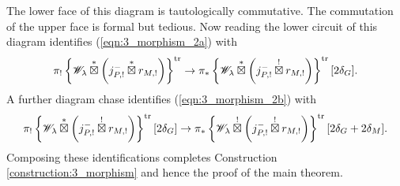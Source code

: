 The lower face of this diagram is tautologically commutative. The commutation of the upper face is formal but tedious. Now reading the lower circuit of this diagram identifies (\ref{eqn:3_morphism_2a}) with
    \[
    \pi_! \left\{ \mathscr{W}_\lambda \overset{*}{\boxtimes} \left( j_{P,!}^- \overset{*}{\boxtimes} r_{M,!} \right) \right\}^{\mathrm{tr}} 
    \to \pi_* \left\{ \mathscr{W}_\lambda \overset{*}{\boxtimes} \left( j_{P,!}^- \overset{!}{\boxtimes} r_{M,!} \right) \right\}^{\mathrm{tr}} [2 \delta_G].
    \]
A further diagram chase identifies (\ref{eqn:3_morphism_2b}) with
    \[
    \pi_! \left\{ \mathscr{W}_\lambda \overset{*}{\boxtimes} \left( j_{P,!}^- \overset{!}{\boxtimes} r_{M,!} \right) \right\}^{\mathrm{tr}} [2 \delta_G]
    \to \pi_* \left\{ \mathscr{W}_\lambda \overset{!}{\boxtimes} \left( j_{P,!}^- \overset{!}{\boxtimes} r_{M,!} \right) \right\}^{\mathrm{tr}} [2 \delta_G + 2 \delta_M].
    \]
Composing these identifications completes Construction \ref{construction:3_morphism} and hence the proof of the main theorem.